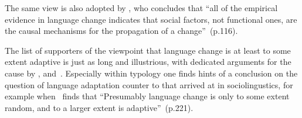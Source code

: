 
The same view is also adopted by \citet{Croft2006}, who concludes that ``all of the empirical evidence in language change indicates that social factors, not functional ones, are the causal mechanisms for the propagation of a change''~(p.116).

The list of supporters of the viewpoint that language change is at least to some extent adaptive is just as long and illustrious, with dedicated arguments for the cause by \citet{Jespersen1949}, \citet{Vennemann1993} and~\citet{Haspelmath1999,Haspelmath2008}.
Especially within typology one finds hints of a conclusion on the question of language adaptation counter to that arrived at in sociolingustics, for example when~\citet{Wichmann2015} finds that ``Presumably language change is only to some extent random, and to a larger extent is adaptive''~(p.221).




